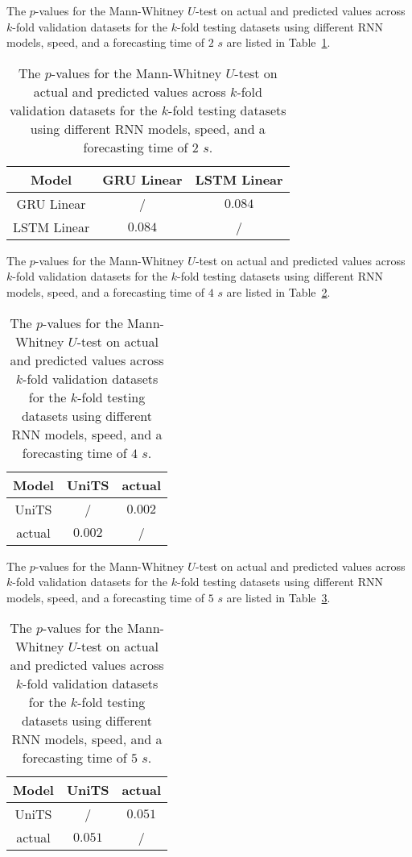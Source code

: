 The $p$-values for the Mann-Whitney $U$-test on actual and predicted values across $k$-fold validation datasets for the $k$-fold testing datasets using different RNN models, speed, and a forecasting time of $2$ $s$ are listed in Table~\ref{tab:speed:p:2}.

\begin{table}[!ht]
	\centering
	\begin{tabular}{|c|c|c|}
		\hline
		Model & GRU Linear & LSTM Linear \\ \hline
		GRU Linear & / & $\mathbf{0.084}$ \\ \hline
		LSTM Linear & $\mathbf{0.084}$ & / \\ \hline
	\end{tabular}
	\caption{The $p$-values for the Mann-Whitney $U$-test on actual and predicted values across $k$-fold validation datasets for the $k$-fold testing datasets using different RNN models, speed, and a forecasting time of $2$ $s$.}
	\label{tab:speed:p:2}
\end{table}

The $p$-values for the Mann-Whitney $U$-test on actual and predicted values across $k$-fold validation datasets for the $k$-fold testing datasets using different RNN models, speed, and a forecasting time of $4$ $s$ are listed in Table~\ref{tab:speed:p:4}.

\begin{table}[!ht]
	\centering
	\begin{tabular}{|c|c|c|}
		\hline
		Model & UniTS & actual \\ \hline
		UniTS & / & $\mathbf{0.002}$ \\ \hline
		actual & $\mathbf{0.002}$ & / \\ \hline
	\end{tabular}
	\caption{The $p$-values for the Mann-Whitney $U$-test on actual and predicted values across $k$-fold validation datasets for the $k$-fold testing datasets using different RNN models, speed, and a forecasting time of $4$ $s$.}
	\label{tab:speed:p:4}
\end{table}

The $p$-values for the Mann-Whitney $U$-test on actual and predicted values across $k$-fold validation datasets for the $k$-fold testing datasets using different RNN models, speed, and a forecasting time of $5$ $s$ are listed in Table~\ref{tab:speed:p:5}.

\begin{table}[!ht]
	\centering
	\begin{tabular}{|c|c|c|}
		\hline
		Model & UniTS & actual \\ \hline
		UniTS & / & $\mathbf{0.051}$ \\ \hline
		actual & $\mathbf{0.051}$ & / \\ \hline
	\end{tabular}
	\caption{The $p$-values for the Mann-Whitney $U$-test on actual and predicted values across $k$-fold validation datasets for the $k$-fold testing datasets using different RNN models, speed, and a forecasting time of $5$ $s$.}
	\label{tab:speed:p:5}
\end{table}

